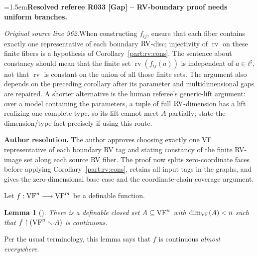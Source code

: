 \documentclass[12pt]{amsart}
\newcommand{\ResolvedRefereeRemark}[5]{%
  \par\medskip\begingroup\normalfont\small\color{gray}%
  \emergencystretch=1.5em\noindent\textbf{Resolved referee R#1 [#2] -- #3.}\par\nobreak\noindent #4\par
  \medskip\color{ResolutionGreen}\noindent\textbf{Author resolution.} #5\par
  \endgroup\medskip
}
\newcommand{\memph}[1]{{\color{magenta}\emph{#1}}}
\theoremstyle{plain}
\newtheorem{lem}[thm]{Lemma}
\theoremstyle{definition}
\theoremstyle{remark}
\numberwithin{equation}{section}
\theoremstyle{plain}
\newcommand{\VF}{\textup{VF}}
\newcommand{\RV}{\textup{RV}}
\newcommand{\0}{\emptyset}
\newcommand{\rest}{\upharpoonright}
\newcommand{\fun}{\longrightarrow}
\newcommand{\sub}{\subseteq}
\newcommand{\mi}{\smallsetminus}
\DeclareMathOperator{\rv}{rv}
\begin{document}
\ResolvedRefereeRemark{033}{Gap}{RV-boundary proof needs uniform branches}{%
\textit{Original source line 962.}\quad When constructing $f_{ij}$, ensure that each fiber contains exactly one representative of each boundary $\RV$-disc; injectivity of $\rv$ on these finite fibers is a hypothesis of Corollary~\ref{part:rv:cons}. The sentence about constancy should mean that the finite set $\rv(f_{ij}(a))$ is independent of $a\in t^\sharp$, not that $\rv$ is constant on the union of all those finite sets. The argument also depends on the preceding corollary after its parameter and multidimensional gaps are repaired. A shorter alternative is the human referee's generic-lift argument: over a model containing the parameters, a tuple of full $\RV$-dimension has a lift realizing one complete type, so its lift cannot meet $A$ partially; state the dimension/type fact precisely if using this route.
}{The author approves choosing exactly one VF representative of each boundary RV tag and stating constancy of the finite RV-image set along each source RV fiber. The proof now splits zero-coordinate faces before applying Corollary~\ref{part:rv:cons}, retains all input tags in the graphs, and gives the zero-dimensional base case and the coordinate-chain coverage argument.}

Let $f : \VF^n \fun \VF^m$ be a definable function.

\begin{lem}[{\cite[Lemma~8.7]{Yin:special:trans}}]\label{fun:almost:cont}
There is a definable closed set $A \sub \VF^n$ with $\dim_{\VF}(A) < n$ such that $f \rest (\VF^n \mi A)$ is continuous.
\end{lem}

Per the usual terminology, this lemma says that $f$ is continuous \memph{almost everywhere}.
\end{document}
